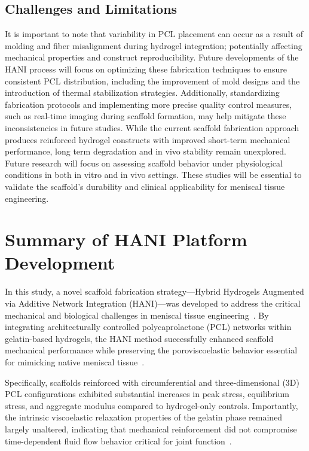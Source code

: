 \subsection{Challenges and Limitations}

It is important to note that variability in PCL placement can occur as a result of molding and fiber misalignment during hydrogel integration; potentially affecting mechanical properties and construct reproducibility. Future developments of the HANI process will focus on optimizing these fabrication techniques to ensure consistent PCL distribution, including the improvement of mold designs and the introduction of thermal stabilization strategies. Additionally, standardizing fabrication protocols and implementing more precise quality control measures, such as real-time imaging during scaffold formation, may help mitigate these inconsistencies in future studies. While the current scaffold fabrication approach produces reinforced hydrogel constructs with improved short-term mechanical performance, long term degradation and in vivo stability remain unexplored. Future research will focus on assessing scaffold behavior under physiological conditions in both in vitro and in vivo settings. These studies will be essential to validate the scaffold's durability and clinical applicability for meniscal tissue engineering.

\section{Summary of HANI Platform Development}

In this study, a novel scaffold fabrication strategy---Hybrid Hydrogels Augmented via Additive Network Integration (HANI)---was developed to address the critical mechanical and biological challenges in meniscal tissue engineering~\cite{makris2011kneemeniscus, gupta2020meniscaltissue}. By integrating architecturally controlled polycaprolactone (PCL) networks within gelatin-based hydrogels, the HANI method successfully enhanced scaffold mechanical performance while preserving the poroviscoelastic behavior essential for mimicking native meniscal tissue~\cite{bulle2021humanmeniscus}.

Specifically, scaffolds reinforced with circumferential and three-dimensional (3D) PCL configurations exhibited substantial increases in peak stress, equilibrium stress, and aggregate modulus compared to hydrogel-only controls. Importantly, the intrinsic viscoelastic relaxation properties of the gelatin phase remained largely unaltered, indicating that mechanical reinforcement did not compromise time-dependent fluid flow behavior critical for joint function~\cite{abdelgaied2015comparisonbiomechanical}.

